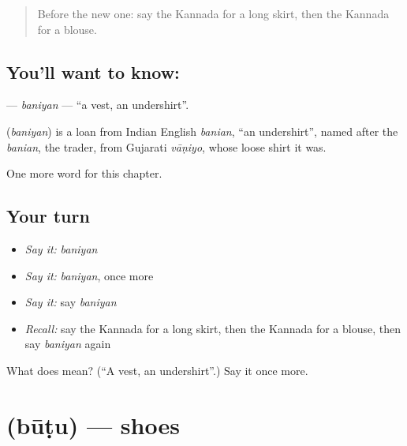 \label{lesson:KA-C222-baniyan}



\begin{quote}
Before the new one: say the Kannada for a long skirt, then the Kannada for a blouse.
\end{quote}

\subsection*{You'll want to know: }
\textbf{} — \emph{baniyan} — \textquotedblleft{}a vest, an undershirt\textquotedblright{}.

\begin{cousinweb}
\textbf{} (\emph{baniyan}) is a loan from Indian English \emph{banian}, \textquotedblleft{}an undershirt\textquotedblright{}, named after the \emph{banian}, the trader, from Gujarati \emph{vāṇiyo}, whose loose shirt it was.
\end{cousinweb}

\begin{grammarlens}[title={What you've built}]
One more word for this chapter.
\end{grammarlens}

\subsection*{Your turn}
\begin{itemize}
\raggedright
  \item \emph{Say it:} \emph{baniyan}
  \item \emph{Say it:} \emph{baniyan}, once more
  \item \emph{Say it:} say \emph{baniyan}
  \item \emph{Recall:} say the Kannada for a long skirt, then the Kannada for a blouse, then say \emph{baniyan} again
\end{itemize}

\begin{tcolorbox}[breakable,colback=teal!4,colframe=teal!35!black,title={Before you move on}]
What does  mean? (\textquotedblleft{}A vest, an undershirt\textquotedblright{}.) Say it once more.
\end{tcolorbox}
\section[\texorpdfstring{\kn{ಬೂಟು} (būṭu)}{ಬೂಟು (būṭu)}]{ (būṭu) — shoes}

